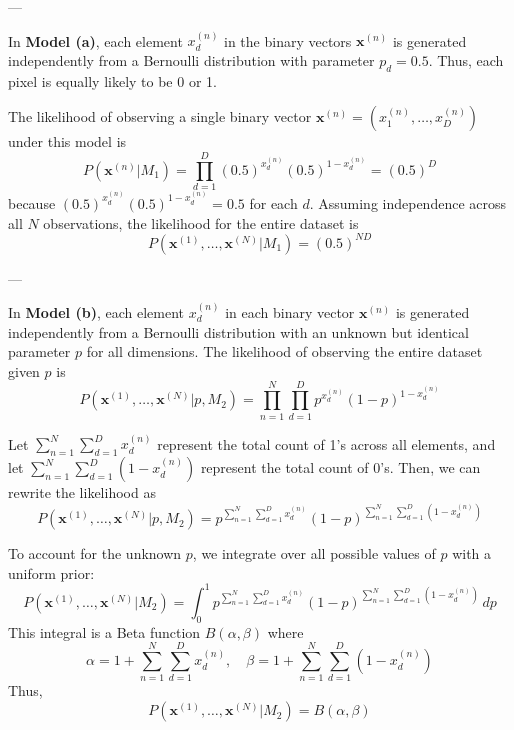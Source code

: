 \documentclass{article}
\begin{document}
    \noindent
    ---
    
    \noindent In \textbf{Model (a)}, each element \( x_d^{(n)} \) in the binary vectors \( \mathbf{x}^{(n)} \) is generated independently from a Bernoulli distribution with parameter \( p_d = 0.5 \). Thus, each pixel is equally likely to be 0 or 1.
    \vspace{5pt}
    
    \noindent The likelihood of observing a single binary vector \( \mathbf{x}^{(n)} = (x_1^{(n)}, \dots, x_D^{(n)}) \) under this model is
    \begin{equation}
        P(\mathbf{x}^{(n)} | M_1) = \prod_{d=1}^{D} (0.5)^{x_d^{(n)}} (0.5)^{1 - x_d^{(n)}} = (0.5)^D
    \end{equation}
    because \( (0.5)^{x_d^{(n)}} (0.5)^{1 - x_d^{(n)}} = 0.5 \) for each \( d \). Assuming independence across all \( N \) observations, the likelihood for the entire dataset is
    \begin{equation}
        P(\mathbf{x}^{(1)}, \dots, \mathbf{x}^{(N)} | M_1) = (0.5)^{ND}
    \end{equation}
    
    \noindent
    ---
    
    \noindent In \textbf{Model (b)}, each element \( x_d^{(n)} \) in each binary vector \( \mathbf{x}^{(n)} \) is generated independently from a Bernoulli distribution with an unknown but identical parameter \( p \) for all dimensions. The likelihood of observing the entire dataset given \( p \) is
    \begin{equation}
        P(\mathbf{x}^{(1)}, \dots, \mathbf{x}^{(N)} | p, M_2) = \prod_{n=1}^{N} \prod_{d=1}^{D} p^{x_d^{(n)}} (1 - p)^{1 - x_d^{(n)}}
    \end{equation}
    
    \noindent Let \( \sum_{n=1}^N \sum_{d=1}^D x_d^{(n)} \) represent the total count of 1's across all elements, and let \( \sum_{n=1}^N \sum_{d=1}^D (1 - x_d^{(n)}) \) represent the total count of 0's. Then, we can rewrite the likelihood as
    \begin{equation}
        P(\mathbf{x}^{(1)}, \dots, \mathbf{x}^{(N)} | p, M_2) = p^{\sum_{n=1}^N \sum_{d=1}^D x_d^{(n)}} (1 - p)^{\sum_{n=1}^N \sum_{d=1}^D (1 - x_d^{(n)})}
    \end{equation}
    
    \noindent To account for the unknown \( p \), we integrate over all possible values of \( p \) with a uniform prior:
    \begin{equation}
        P(\mathbf{x}^{(1)}, \dots, \mathbf{x}^{(N)} | M_2) = \int_0^1 p^{\sum_{n=1}^N \sum_{d=1}^D x_d^{(n)}} (1 - p)^{\sum_{n=1}^N \sum_{d=1}^D (1 - x_d^{(n)})} \, dp
    \end{equation}
    This integral is a Beta function \( B(\alpha, \beta) \) where
    \begin{equation}
        \alpha = 1 + \sum_{n=1}^N \sum_{d=1}^D x_d^{(n)}, \quad \beta = 1 + \sum_{n=1}^N \sum_{d=1}^D (1 - x_d^{(n)})
    \end{equation}
    Thus,
    \begin{equation}
        P(\mathbf{x}^{(1)}, \dots, \mathbf{x}^{(N)} | M_2) = B(\alpha, \beta)
    \end{equation}
    
\end{document}
